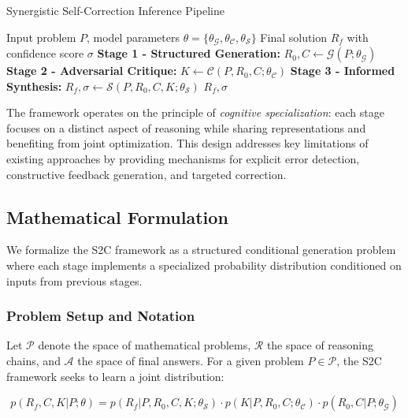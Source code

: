 \documentclass[10pt,twocolumn]{article}
\newcommand{\ssc}{\textsc{S2C}}
\newcommand{\Generator}{\mathcal{G}}
\newcommand{\Critic}{\mathcal{C}}
\newcommand{\Synthesizer}{\mathcal{S}}
\begin{document}
\begin{algorithm}[H]
\caption{Synergistic Self-Correction Inference Pipeline}
\label{alg:s2c_inference}
\begin{algorithmic}[1]
\REQUIRE Input problem $P$, model parameters $\theta = \{\theta_\Generator, \theta_\Critic, \theta_\Synthesizer\}$
\ENSURE Final solution $R_f$ with confidence score $\sigma$
\STATE \textbf{Stage 1 - Structured Generation:}
\STATE $R_0, C \leftarrow \Generator(P; \theta_\Generator)$ 
\STATE \textbf{Stage 2 - Adversarial Critique:}
\STATE $K \leftarrow \Critic(P, R_0, C; \theta_\Critic)$ 
\STATE \textbf{Stage 3 - Informed Synthesis:}
\STATE $R_f, \sigma \leftarrow \Synthesizer(P, R_0, C, K; \theta_\Synthesizer)$ 
\RETURN $R_f, \sigma$
\end{algorithmic}
\end{algorithm}

The framework operates on the principle of \textit{cognitive specialization}: each stage focuses on a distinct aspect of reasoning while sharing representations and benefiting from joint optimization. This design addresses key limitations of existing approaches by providing mechanisms for explicit error detection, constructive feedback generation, and targeted correction.

\subsection{Mathematical Formulation}

We formalize the \ssc{} framework as a structured conditional generation problem where each stage implements a specialized probability distribution conditioned on inputs from previous stages.

\subsubsection{Problem Setup and Notation}

Let $\mathcal{P}$ denote the space of mathematical problems, $\mathcal{R}$ the space of reasoning chains, and $\mathcal{A}$ the space of final answers. For a given problem $P \in \mathcal{P}$, the \ssc{} framework seeks to learn a joint distribution:

\begin{equation}
p(R_f, C, K | P; \theta) = p(R_f | P, R_0, C, K; \theta_\Synthesizer) \cdot p(K | P, R_0, C; \theta_\Critic) \cdot p(R_0, C | P; \theta_\Generator)
\end{equation}
\end{document}
